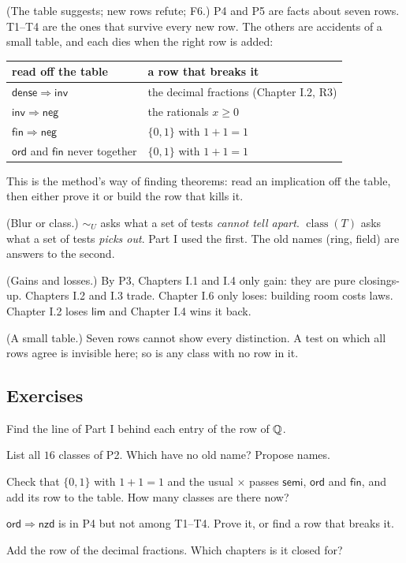\begin{lines}
\item[\lab{R1}] (The table suggests; new rows refute; F6.) P4 and P5 are facts about seven rows. T1--T4 are the ones that survive every new row. The others are accidents of a small table, and each dies when the right row is added:
\begin{center}
\renewcommand{\arraystretch}{1.2}
\begin{tabular}{ll}
read off the table & a row that breaks it \\ \hline
$\mathsf{dense} \Rightarrow \mathsf{inv}$ & the decimal fractions (Chapter I.2, R3) \\
$\mathsf{inv} \Rightarrow \mathsf{neg}$ & the rationals $x \ge 0$ \\
$\mathsf{fin} \Rightarrow \mathsf{neg}$ & $\{0,1\}$ with $1 + 1 = 1$ \\
$\mathsf{ord}$ and $\mathsf{fin}$ never together & $\{0,1\}$ with $1 + 1 = 1$ \\
\end{tabular}
\end{center}
This is the method's way of finding theorems: read an implication off the table, then either prove it or build the row that kills it.
\item[\lab{R2}] (Blur or class.) $\sim_U$ asks what a set of tests \emph{cannot tell apart}. $\operatorname{class}(T)$ asks what a set of tests \emph{picks out}. Part I used the first. The old names (ring, field) are answers to the second.
\item[\lab{R3}] (Gains and losses.) By P3, Chapters I.1 and I.4 only gain: they are pure closings-up. Chapters I.2 and I.3 trade. Chapter I.6 only loses: building room costs laws. Chapter I.2 loses $\mathsf{lim}$ and Chapter I.4 wins it back.
\item[\lab{R4}] (A small table.) Seven rows cannot show every distinction. A test on which all rows agree is invisible here; so is any class with no row in it.
\end{lines}

\subsection*{Exercises}

\begin{lines}
\item[\lab{E1}] Find the line of Part I behind each entry of the row of $\mathbb{Q}$.
\item[\lab{E2}] List all $16$ classes of P2. Which have no old name? Propose names.
\item[\lab{E3}] Check that $\{0,1\}$ with $1 + 1 = 1$ and the usual $\times$ passes $\mathsf{semi}$, $\mathsf{ord}$ and $\mathsf{fin}$, and add its row to the table. How many classes are there now?
\item[\lab{E4}] $\mathsf{ord} \Rightarrow \mathsf{nzd}$ is in P4 but not among T1--T4. Prove it, or find a row that breaks it.
\item[\lab{E5}] Add the row of the decimal fractions. Which chapters is it closed for?
\end{lines}

